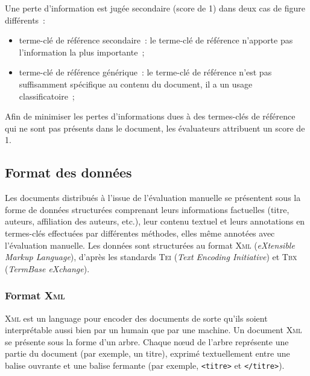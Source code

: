         Une perte d'information est jugée secondaire (score de 1) dans deux
        cas de figure différents~:
        \begin{itemize}
          \item{terme-clé de référence secondaire~: le terme-clé de référence
                n'apporte pas l'information la plus importante~;}
          \item{terme-clé de référence générique~: le terme-clé de référence
                n'est pas suffisamment spécifique au contenu du document, il a
                un usage classificatoire~;}
        \end{itemize}
        Afin de minimiser les pertes d'informations dues à des termes-clés de
        référence qui ne sont pas présents dans le document, les évaluateurs
        attribuent un score de 1.



    \subsection{Format des données}
    \label{subsec:main-automatic_evaluation_of_keyphrase_annotation-methodology-data_format}
      Les documents distribués à l'issue de l'évaluation manuelle se présentent
      sous la forme de données structurées comprenant leurs
      informations factuelles (titre, auteurs, affiliation des auteurs, etc.),
      leur contenu textuel et leurs annotations en termes-clés effectuées par
      différentes méthodes, elles même annotées avec l'évaluation manuelle. Les
      données sont structurées au format \textsc{Xml} (\textit{eXtensible Markup
      Language}), d'après les standards \textsc{Tei} (\textit{Text Encoding
      Initiative}) et \textsc{Tbx} (\textit{TermBase eXchange}).

      \subsubsection{Format \textsc{Xml}}
      \label{subsubsec:main-automatic_evaluation_of_keyphrase_annotation-methodology-data_format-xml}
        \textsc{Xml} est un language pour encoder des documents de sorte qu'ils
        soient interprétable aussi bien par un humain que par une machine. Un
        document \textsc{Xml} se présente sous la forme d'un arbre. Chaque
        n\oe{}ud de l'arbre représente une partie du document (par exemple, un
        titre), exprimé textuellement entre une balise ouvrante et une balise
        fermante (par exemple, \texttt{<titre>} et \texttt{</titre>}).

